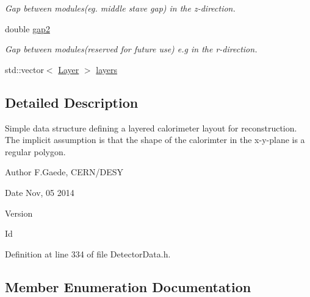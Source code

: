 \begin{DoxyCompactItemize}
\begin{DoxyCompactList}\small\item\em Gap between modules(eg. middle stave gap) in the z-\/direction. \end{DoxyCompactList}\item 
double \hyperlink{struct_d_d4hep_1_1_d_d_rec_1_1_layered_calorimeter_struct_a72a13e8a8f2a42bdf6b5fa2e5bfad10d}{gap2}
\begin{DoxyCompactList}\small\item\em Gap between modules(reserved for future use) e.\+g in the r-\/direction. \end{DoxyCompactList}\item 
std\+::vector$<$ \hyperlink{struct_d_d4hep_1_1_d_d_rec_1_1_layered_calorimeter_struct_1_1_layer}{Layer} $>$ \hyperlink{struct_d_d4hep_1_1_d_d_rec_1_1_layered_calorimeter_struct_afe938fc0d544b503acde8269461df211}{layers}
\end{DoxyCompactItemize}


\subsection{Detailed Description}
Simple data structure defining a layered calorimeter layout for reconstruction. The implicit assumption is that the shape of the calorimter in the x-\/y-\/plane is a regular polygon.

\begin{DoxyAuthor}{Author}
F.\+Gaede, C\+E\+R\+N/\+D\+E\+SY 
\end{DoxyAuthor}
\begin{DoxyDate}{Date}
Nov, 05 2014 
\end{DoxyDate}
\begin{DoxyVersion}{Version}

\end{DoxyVersion}
\begin{DoxyParagraph}{Id}

\end{DoxyParagraph}


Definition at line 334 of file Detector\+Data.\+h.



\subsection{Member Enumeration Documentation}
\hypertarget{struct_d_d4hep_1_1_d_d_rec_1_1_layered_calorimeter_struct_a560e60d5a6a1671ab8b21629714b4d36}{}\label{struct_d_d4hep_1_1_d_d_rec_1_1_layered_calorimeter_struct_a560e60d5a6a1671ab8b21629714b4d36} 
